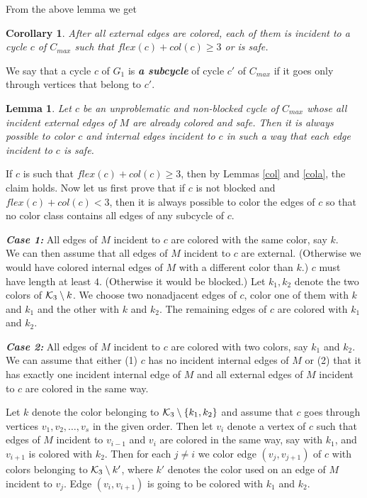 \documentclass[a4, 11pt]{article}
\newcommand{\dowod}{\noindent{\bf Proof.~}}
\newcommand{\<}{\langle}
\renewcommand{\>}{\rangle}
\newcommand{\Kt}{{\cal K}_3}
\newtheorem{lemma}{Lemma}
\newtheorem{corollary}{Corollary}
\begin{document}
From the above lemma we get
\begin{corollary}\label{colsafe}
After all external edges are colored, each of them is incident to a cycle $c$ of $C_{max}$ such that  $flex(c)+col(c) \geq 3$ or is safe.
\end{corollary}

We say that a cycle $c$ of $G_1$ is {\bf \em  a subcycle}  of cycle $c'$ of $C_{max}$ if it goes only through vertices that belong to $c'$.

\begin{lemma} \label{coluzup}
Let $c$ be an unproblematic  and non-blocked cycle of $C_{max}$ whose all incident external edges of $M$ are already colored and safe.  Then it is always possible to color $c$ and internal  edges incident to $c$  in such a way that each edge incident to $c$ is safe.
\end{lemma} 

\dowod
If $c$ is such that   $flex(c)+col(c) \geq 3$, then by Lemmas \ref{col}  and \ref{cola},  the claim holds.
Now let us first  prove that if $c$ is not blocked and   $flex(c)+col(c) < 3$, then it is always  possible to color the edges of $c$ so that no color class contains all edges of  any subcycle of  $c$.

{\bf \em Case 1:}  All  edges of $M$ incident to $c$ are colored with the same color, say $k$. \\
We can  then assume that all edges of $M$ incident to $c$ are external. (Otherwise we would have colored internal edges  of $M$  with a different color than $k$.)
$c$ must have length at least $4$. (Otherwise it would be blocked.)  Let $k_1, k_2$  denote the two colors of $\Kt \setminus k$.
We choose two nonadjacent edges of $c$, color one of them with $k$ and $k_1$ and the other with $k$ and $k_2$. The remaining edges of $c$ are colored with $k_1$ and $k_2$.

{\bf \em Case 2:}  All  edges of $M$ incident to $c$ are colored with two colors, say $k_1$ and $k_2$. \\
We can assume that either (1)  $c$ has no incident internal edges of $M$  or (2)  that it has exactly one incident internal edge of $M$ and all external edges of $M$ incident to $c$ are colored in the same way.

Let $k$ denote the color belonging to $\Kt \setminus \{k_1, k_2\}$  and assume that $c$ goes through vertices $v_1, v_2, \ldots, v_s$ in the given order.
Then let $v_i$ denote a vertex of $c$ such that edges of $M$ incident to  $v_{i-1}$ and $v_i$ are colored in the same way, say with $k_1$, and $v_{i+1}$ is colored with $k_2$. Then for each $j \neq i$  we color  edge $(v_j, v_{j+1})$  of $c$ with colors belonging to 
$\Kt \setminus k'$, where $k'$ denotes the color used on an edge of $M$ incident to $v_j$. Edge $(v_i, v_{i+1})$ is going to be colored with $k_1$ and $k_2$. 
\end{document}
